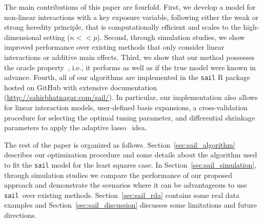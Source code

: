 \documentclass[12pt,letter]{article}\usepackage[]{graphicx}\usepackage[]{color}
\newcommand{\xmark}{\ding{55}}%
\newcommand{\sail}{\texttt{sail}}
\begin{document}
The main contributions of this paper are fourfold.
First, we develop a model for non-linear interactions with a key exposure variable, following either the weak or strong heredity principle, that is computationally efficient and scales to the high-dimensional setting ($n << p$).
Second, through simulation studies, we show improved performance over existing methods that only consider linear interactions or additive main effects.
Third, we show that our method possesses the oracle property~\citep{fan2001variable}, i.e., it performs as well as if the true model were known in advance.
Fourth, all of our algorithms are implemented in the \texttt{sail} R package hosted on GitHub with extensive documentation (\url{http://sahirbhatnagar.com/sail/}). In particular, our implementation also allows for linear interaction models, user-defined basis expansions, a cross-validation procedure for selecting the optimal tuning parameter, and differential shrinkage parameters to apply the adaptive lasso~\citep{zou2006adaptive} idea.

The rest of the paper is organized as follows. Section~\ref{sec:sail_algorithm} describes our optimization procedure and some details about the algorithm used to fit the \texttt{sail} model for the least squares case. In Section~\ref{sec:sail_simulation}, through simulation studies we compare the performance of our proposed approach and demonstrate the scenarios where it can be advantageous to use \sail ~over existing methods. Section~\ref{sec:sail_rda} contains some real data examples and Section~\ref{sec:sail_discussion} discusses some limitations and future directions.

\end{document}

